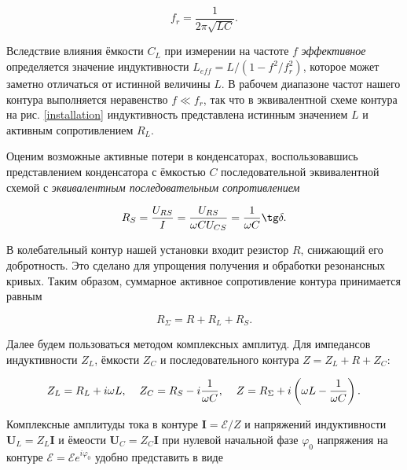 \documentclass[a4paper, 12pt]{article}
\begin{document}
    \begin{equation}
        \label{freq}
        f_r = \frac{1}{2 \pi \sqrt{L C}}.
    \end{equation} 
    
    Вследствие влияния ёмкости $C_L$ при измерении на частоте $f$ \textit{эффективное} определяется значение индуктивности $L_{eff} = L/(1-f^2/f_r^2)$, которое может заметно отличаться от истинной величины $L$. В рабочем диапазоне частот нашего контура выполняется неравенство $f \ll f_r$, так что в эквивалентной схеме контура на рис. \ref{installation} индуктивность представлена истинным значением $L$ и активным сопротивлением $R_L$.

    Оценим возможные активные потери в конденсаторах, воспользовавшись представлением конденсатора с ёмкостью $C$ последовательной эквивалентной схемой с \textit{эквивалентным последовательным сопротивлением}

    \begin{equation}
        R_S = \frac{U_{RS}}{I} = \frac{U_{RS}}{\omega C U_{CS}} = \frac{1}{\omega C} \tg \delta.
    \end{equation}

    В колебательный контур нашей установки входит резистор $R$, снижающий его добротность. Это сделано для упрощения получения и обработки резонансных кривых. Таким образом, суммарное активное сопротивление контура принимается равным

    \begin{equation}
        R_\Sigma = R + R_L + R_S.
    \end{equation}

    Далее будем пользоваться методом комплексных амплитуд. Для импедансов индуктивности $Z_L$, ёмкости $Z_C$ и последовательного контура $Z = Z_L + R + Z_C$:

    \begin{equation}
        \label{impedance}
        Z_L = R_L + i\omega L, \hspace{4mm} Z_C = R_S - i\frac{1}{\omega C}, \hspace{4mm} Z = R_\Sigma + i \left( \omega L - \frac{1}{\omega C} \right).
    \end{equation}

    Комплексные амплитуды тока в контуре $\bm{I} = \bm{\mathcal{E}}/Z$ и напряжений индуктивности $\bm{U}_L = Z_L \bm{I}$ и ёмеости $\bm{U}_C = Z_C \bm{I}$ при нулевой начальной фазе $\varphi_0$ напряжения на контуре $\bm{\mathcal{E}} = \mathcal{E} e^{i \varphi_0}$ удобно представить в виде
\end{document}
